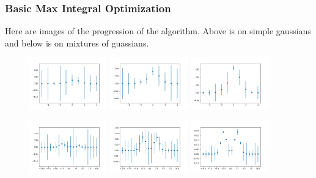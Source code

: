 \documentclass[8pt]{beamer}
\begin{document}
\begin{frame}
\frametitle{Basic Max Integral Optimization}
Here are images of the progression of the algorithm. Above is on simple gaussians and below is on mixtures of guassians.
\begin{figure}
   \includegraphics[width=0.3\textwidth]{im1}
   \hfill
   \includegraphics[width=0.3\textwidth]{im2}
   \hfill
   \includegraphics[width=0.3\textwidth]{im3}
\end{figure}
\begin{figure}
   \includegraphics[width=0.3\textwidth]{im11}
   \hfill
   \includegraphics[width=0.3\textwidth]{im12}
   \hfill
   \includegraphics[width=0.3\textwidth]{im13}
\end{figure}
\end{frame}
\end{document}
